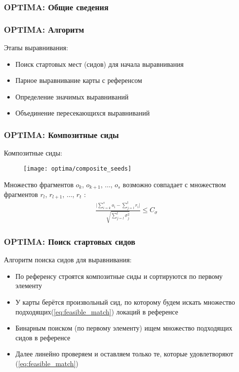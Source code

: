 \begin{frame}
\frametitle{OPTIMA: Общие сведения}


\end{frame}

\begin{frame}
\frametitle{OPTIMA: Алгоритм}

Этапы выравнивания:
\begin{itemize}
  \item Поиск стартовых мест (сидов) для начала выравнивания
  \item Парное выравнивание карты с референсом
  \item Определение значимых выравниваний
  \item Объединение пересекающихся выравниваний
\end{itemize}

\end{frame}

\begin{frame}
\frametitle{OPTIMA: Композитные сиды}
Композитные сиды:
\begin{figure}
  \centering
  \texttt{[image: optima/composite\_seeds]}
\end{figure}
Множество фрагментов $o_k$, $o_{k + 1}$, $ \dots$, $o_{s}$ возможно
совпадает с множеством фрагментов $r_l$, $r_{l+1}$, $\dots$, $r_{t}$ :
\begin{gather}
\frac{\bigg|\sum\limits_{i = k}^s o_i - \sum\limits_{j = l}^t r_i \bigg|}{\sqrt{\sum\limits_{j = l}^t\sigma_j^2}} \le C_{\sigma}
\label{eq:feasible_match}
\end{gather}

\end{frame}

\begin{frame}
\frametitle{OPTIMA: Поиск стартовых сидов}
Алгоритм поиска сидов для выравнивания:
\begin{itemize}
  \item По референсу строятся композитные сиды и сортируются по первому элементу
  \item У карты берётся произвольный сид, по которому будем искать множество подходящих(\ref{eq:feasible_match}) локаций в референсе
  \item Бинарным поиском (по первому элементу) ищем множество подходящих сидов в референсе
  \item Далее линейно проверяем и оставляем только те, которые удовлетворяют (\ref{eq:feasible_match})
\end{itemize}
\end{frame}

